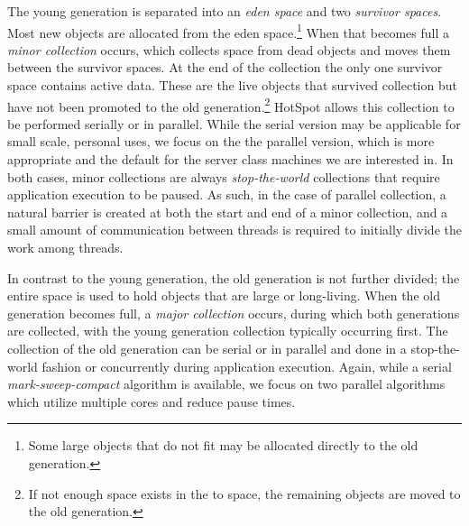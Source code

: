 \documentclass{sig-alternate}
\begin{document}
The young generation is separated into an \textit{eden space} and two \textit{survivor spaces}. Most new objects are allocated from the eden space.\footnote{Some large objects that do not fit may be allocated directly to the old generation.} When that becomes full a \textit{minor collection} occurs, which collects space from dead objects and moves them between the survivor spaces. At the end of the collection the only one survivor space contains active data. These are the live objects that survived collection but have not been promoted to the old generation.\footnote{If not enough space exists in the to space, the remaining objects are moved to the old generation.} HotSpot allows this collection to be performed serially or in parallel. While the serial version may be applicable for small scale, personal uses, we focus on the the parallel version, which is more appropriate and the default for the server class machines we are interested in. In both cases, minor collections are always \textit{stop-the-world} collections that require application execution to be paused. As such, in the case of parallel collection, a natural barrier is created at both the start and end of a minor collection, and a small amount of communication between threads is required to initially divide the work among threads.

In contrast to the young generation, the old generation is not further divided; the entire space is used to hold objects that are large or long-living. When the old generation becomes full, a \textit{major collection} occurs, during which both generations are collected, with the young generation collection typically occurring first. The collection of the old generation can be serial or in parallel and done in a stop-the-world fashion or concurrently during application execution. Again, while a serial \textit{mark-sweep-compact} algorithm is available, we focus on two parallel algorithms which utilize multiple cores and reduce pause times.
\end{document}
